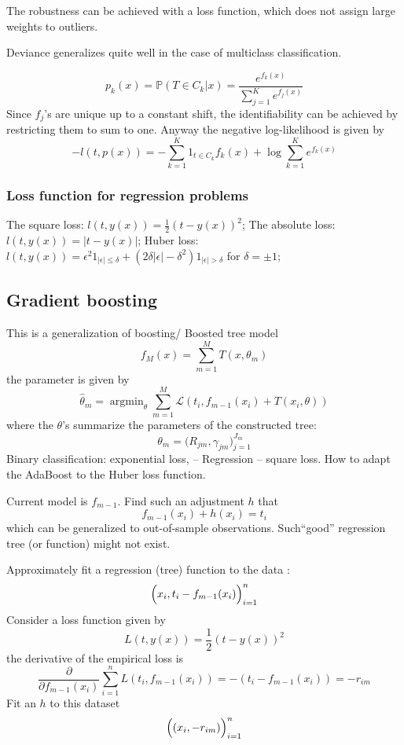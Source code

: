 \documentclass[a4paper]{article}
\newcommand{\Lcal}{\mathcal{L}}
\newcommand{\pr}[0]{{\mathbb{P}}}
\newcommand{\argmin}{\mathop{\text{argmin}}}
\begin{document}
The robustness can be achieved with a loss function, which does not assign large
weights to outliers.

Deviance generalizes quite well in the case of multiclass classification.

\[
p_k(x)
= \pr(T\in C_k|x)
= \frac{ e^{f_k(x)} }{\sum_{j=1}^K e^{f_j(x)} }
\]
Since $f_j$'s are unique up to a constant shift, the identifiability can be achieved
by restricting them to sum to one. Anyway the negative log-likelihood is given by
\[-l(t, p(x)) = -\sum_{k=1}^K 1_{t\in C_k} f_k(x) + \log \sum_{k=1}^K e^{f_k(x)}\]

\subsubsection{Loss function for regression problems} %
\label{ssub:loss_function_for_regression_problems}

The square loss: $l(t, y(x)) = \frac{1}{2}(t-y(x))^2$;
The absolute loss: $l(t, y(x)) = |t-y(x)|$;
Huber loss: $l(t, y(x)) = \epsilon^2 1_{|\epsilon|\leq \delta} + (2\delta |\epsilon| - \delta^2) 1_{|\epsilon| > \delta}$
for $\delta = \pm 1$;



\subsection{Gradient boosting} %
\label{sub:gradient_boosting}

This is a generalization of boosting/ Boosted tree model
\[f_M(x) = \sum_{m=1}^M T(x, \theta_m)\]
the parameter is given by 
\[\hat{\theta}_m = \argmin_\theta \sum_{m=1}^M \Lcal( t_i, f_{m-1}(x_i) + T(x_i, \theta) )\]
where the $\theta$'s summarize the parameters of the constructed tree:
\[\theta_m = \bigl(R_{jm}, \gamma_{jm}\bigr)_{j=1}^{J_m}\]
Binary classification: exponential loss, -- Regression -- square loss.
How to adapt the AdaBoost to the Huber loss function.

Current model is $f_{m-1}$. Find such an adjustment $h$ that
\[f_{m-1}(x_i) + h(x_i) = t_i\]
which can be generalized to out-of-sample observations. Such``good'' regression
tree (or function) might not exist.

Approximately fit a regression (tree) function to the data :
\[\Bigl(x_i, t_i - f_{m-1}(x_i)\Bigr)_{i=1}^n\]
Consider a loss function given by
\[L(t, y(x)) = \frac{1}{2}(t-y(x))^2\]
the derivative of the empirical loss is
\[
\frac{\partial}{\partial f_{m-1}(x_i) } \sum_{i=1}^n L(t_i, f_{m-1}(x_i))
= -( t_i - f_{m-1}(x_i) )
= - r_{im}
\]
Fit an $h$ to this dataset
\[\Bigl((x_i, -r_{im})\Bigr)_{i=1}^n\]
\end{document}
